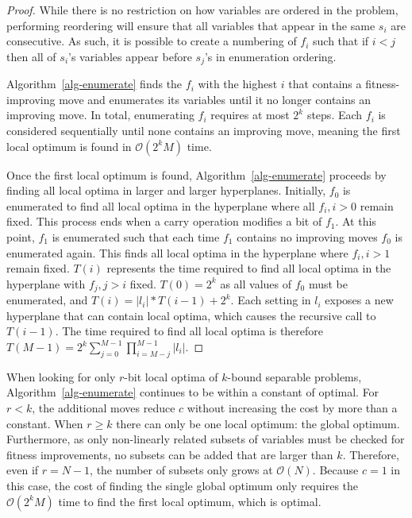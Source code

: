 \documentclass[runningheads,a4paper]{llncs}
\newcommand{\BigO}[1]{$\mathcal{O}{(#1)}$}
\begin{document}
\begin{proof}
While there is no restriction on how variables are ordered in the problem,
performing reordering will ensure that
all variables that appear in the same $s_i$ are consecutive.
As such, it is possible to create a numbering of $f_i$ such that if $i < j$ then all of $s_i$'s
variables appear before $s_j$'s in enumeration ordering.

Algorithm~\ref{alg-enumerate} finds the $f_i$ with the highest $i$ that contains a
fitness-improving move and enumerates its variables until it no longer
contains an improving move. In total, enumerating $f_i$ requires at most $2^k$
steps. Each $f_i$ is considered sequentially until none contains an improving move,
meaning the first local optimum is found in \BigO{2^kM} time.

Once the first local optimum is found, Algorithm~\ref{alg-enumerate} proceeds
by finding all local optima in larger and larger hyperplanes. Initially, $f_0$
is enumerated to find all local optima in the hyperplane where all $f_i, i>0$ remain
fixed. This process ends when a carry operation modifies a bit of $f_1$. At
this point, $f_1$ is enumerated such that each time $f_1$ contains no improving moves
$f_0$ is enumerated again. This finds all local optima in the hyperplane where $f_i, i>1$ remain
fixed. $T(i)$ represents the time required to find all local optima in the hyperplane
with $f_j, j>i$ fixed. $T(0)=2^k$ as all values of $f_0$ must be enumerated, and
$T(i) = |l_i|*T(i-1)+2^k$.
Each setting in $l_i$ exposes a new hyperplane
that can contain local optima, which causes the recursive call to $T(i-1)$.
The time required to find all local optima is therefore
$T(M-1) = 2^k\sum_{j=0}^{M-1} \prod_{i=M-j}^{M-1} |l_i|$.
\end{proof}

When looking for only $r$-bit local optima of $k$-bound separable problems,
Algorithm~\ref{alg-enumerate} continues to be within a constant of optimal.
For $r < k$, the additional moves reduce $c$ without increasing the cost
by more than a constant.
When $r \geq k$ there can only be one local optimum: the global optimum. Furthermore, as
only non-linearly related subsets of variables must be checked
for fitness improvements, no subsets can be added that are larger than $k$.
Therefore, even if $r=N-1$, the number of subsets only grows at \BigO{N}.
Because $c=1$ in this case, the cost of finding the single global optimum
only requires the \BigO{2^kM} time to find the first local optimum, which is
optimal.
\end{document}
